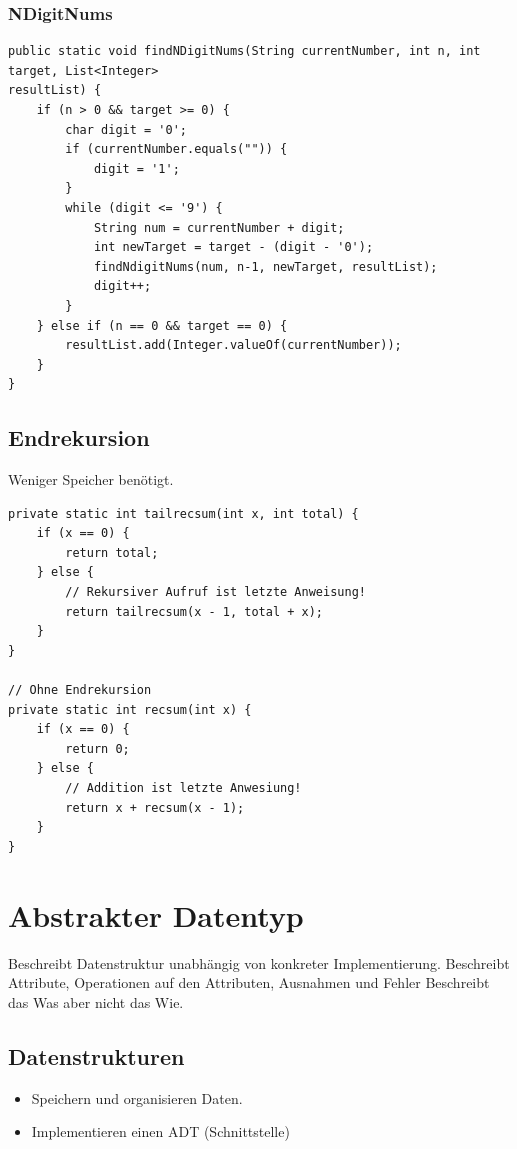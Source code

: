 \begin{multicols*}{4}
 	\subsubsection{NDigitNums}
		\begin{lstlisting}
public static void findNDigitNums(String currentNumber, int n, int target, List<Integer>
resultList) {
	if (n > 0 && target >= 0) {
		char digit = '0';
		if (currentNumber.equals("")) {
			digit = '1';
		}
		while (digit <= '9') {
			String num = currentNumber + digit;
			int newTarget = target - (digit - '0');
			findNdigitNums(num, n-1, newTarget, resultList);
			digit++;
		}
	} else if (n == 0 && target == 0) {
		resultList.add(Integer.valueOf(currentNumber));
	}
}
		\end{lstlisting}

	\subsection{Endrekursion}
	Weniger Speicher benötigt.
		\begin{lstlisting}
private static int tailrecsum(int x, int total) {
	if (x == 0) {
		return total;
	} else {
		// Rekursiver Aufruf ist letzte Anweisung!
		return tailrecsum(x - 1, total + x);
	}
}

// Ohne Endrekursion
private static int recsum(int x) {
	if (x == 0) {
		return 0;
	} else {
		// Addition ist letzte Anwesiung!
		return x + recsum(x - 1);
	}
}
		\end{lstlisting}

\columnbreak

\section{Abstrakter Datentyp}
Beschreibt Datenstruktur unabhängig von konkreter Implementierung.
Beschreibt Attribute, Operationen auf den Attributen, Ausnahmen und Fehler
Beschreibt das Was aber nicht das Wie.

	\subsection{Datenstrukturen}
		\begin{itemize}
			\item Speichern und organisieren Daten.
			\item Implementieren einen ADT (Schnittstelle)
		\end{itemize}
	

\end{multicols*}

